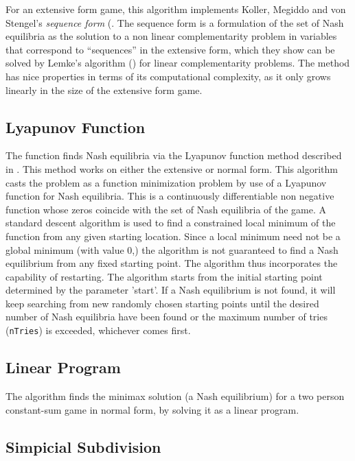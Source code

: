 For an extensive form game, this algorithm implements Koller, Megiddo
and von Stengel's {\em sequence form} (\cite{KolMegSte:94}. The
sequence form is a formulation of the set of Nash equilibria as the
solution to a non linear complementarity problem in variables that
correspond to ``sequences'' in the extensive form, which they show can
be solved by Lemke's algorithm (\cite{Lem:65}) for linear
complementarity problems.  The method has nice properties in terms of
its computational complexity, as it only grows linearly in the size of
the extensive form game.

\subsection{Lyapunov Function}

The  function finds Nash equilibria via the Lyapunov
function method described in \cite{McK:91}.  This method works on
either the extensive or normal form.  This algorithm casts the problem
as a function minimization problem by use of a Lyapunov function for
Nash equilibria.  This is a continuously differentiable non negative
function whose zeros coincide with the set of Nash equilibria of the
game.  A standard descent algorithm is used to find a constrained
local minimum of the function from any given starting location.  Since
a local minimum need not be a global minimum (with value 0,) the
algorithm is not guaranteed to find a Nash equilibrium from any fixed
starting point.  The algorithm thus incorporates the capability of
restarting.  The algorithm starts from the initial starting point
determined by the parameter 'start'.  If a Nash equilibrium is not
found, it will keep searching from new randomly chosen starting points
until the desired number of Nash equilibria have been found or the
maximum number of tries (\verb+nTries+) is exceeded, whichever
comes first.

\subsection{Linear Program}

The  algorithm finds the minimax solution (a Nash
equilibrium) for a two person constant-sum game in normal form, by
solving it as a linear program.

\subsection{Simpicial Subdivision}

